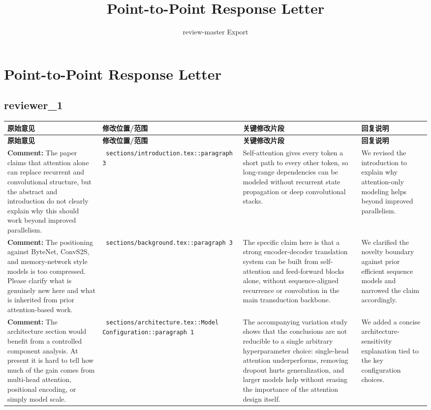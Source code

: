 \documentclass[11pt]{article}
\title{Point-to-Point Response Letter}
\author{review-master Export}
\date{}
\begin{document}
\maketitle

\section*{Point-to-Point Response Letter}

\subsection*{ reviewer\_1 }
\begin{longtable}{|p{}|p{}|p{}|p{}|}
\hline
\textbf{原始意见} & \textbf{修改位置/范围} & \textbf{关键修改片段} & \textbf{回复说明} \\
\hline
\endfirsthead
\hline
\textbf{原始意见} & \textbf{修改位置/范围} & \textbf{关键修改片段} & \textbf{回复说明} \\
\hline
\endhead
\textbf{Comment:} The paper claims that attention alone can replace recurrent and convolutional structure, but the abstract and introduction do not clearly explain why this should work beyond improved parallelism. & \texttt{ sections/introduction.tex::paragraph 3 } & {\color{blue}\ttfamily Self-attention gives every token a short path to every other token, so long-range dependencies can be modeled without recurrent state propagation or deep convolutional stacks.} & We revised the introduction to explain why attention-only modeling helps beyond improved parallelism. \\
\hline
\textbf{Comment:} The positioning against ByteNet, ConvS2S, and memory-network style models is too compressed. Please clarify what is genuinely new here and what is inherited from prior attention-based work. & \texttt{ sections/background.tex::paragraph 3 } & {\color{blue}\ttfamily The specific claim here is that a strong encoder-decoder translation system can be built from self-attention and feed-forward blocks alone, without sequence-aligned recurrence or convolution in the main transduction backbone.} & We clarified the novelty boundary against prior efficient sequence models and narrowed the claim accordingly. \\
\hline
\textbf{Comment:} The architecture section would benefit from a controlled component analysis. At present it is hard to tell how much of the gain comes from multi-head attention, positional encoding, or simply model scale. & \texttt{ sections/architecture.tex::Model Configuration::paragraph 1 } & {\color{blue}\ttfamily The accompanying variation study shows that the conclusions are not reducible to a single arbitrary hyperparameter choice: single-head attention underperforms, removing dropout hurts generalization, and larger models help without erasing the importance of the attention design itself.} & We added a concise architecture-sensitivity explanation tied to the key configuration choices. \\

\end{longtable}
\end{document}
